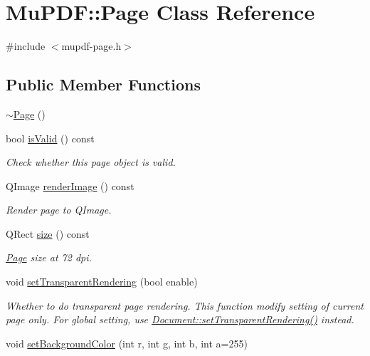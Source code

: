 \hypertarget{class_mu_p_d_f_1_1_page}{\section{Mu\-P\-D\-F\-:\-:Page Class Reference}
\label{class_mu_p_d_f_1_1_page}
}


{\ttfamily \#include $<$mupdf-\/page.\-h$>$}

\subsection*{Public Member Functions}
\begin{DoxyCompactItemize}
\item 
\hyperlink{class_mu_p_d_f_1_1_page_af319e925b5460b6b09a40aacd1d68347}{$\sim$\-Page} ()
\item 
bool \hyperlink{class_mu_p_d_f_1_1_page_a1f60d3a284731ac220a8717eb6a93167}{is\-Valid} () const 
\begin{DoxyCompactList}\small\item\em Check whether this page object is valid. \end{DoxyCompactList}\item 
Q\-Image \hyperlink{class_mu_p_d_f_1_1_page_a50c32d7917fe979dcf5404d378852556}{render\-Image} () const 
\begin{DoxyCompactList}\small\item\em Render page to Q\-Image. \end{DoxyCompactList}\item 
Q\-Rect \hyperlink{class_mu_p_d_f_1_1_page_afd724fcf89232f953315c76ec5a134b0}{size} () const 
\begin{DoxyCompactList}\small\item\em \hyperlink{class_mu_p_d_f_1_1_page}{Page} size at 72 dpi. \end{DoxyCompactList}\item 
void \hyperlink{class_mu_p_d_f_1_1_page_ac6768d64b88de1ccdd1fa0abb2724db0}{set\-Transparent\-Rendering} (bool enable)
\begin{DoxyCompactList}\small\item\em Whether to do transparent page rendering. This function modify setting of current page only. For global setting, use \hyperlink{class_mu_p_d_f_1_1_document_a8df89d0517437182406e2ba766402a3c}{Document\-::set\-Transparent\-Rendering()} instead. \end{DoxyCompactList}\item 
void \hyperlink{class_mu_p_d_f_1_1_page_a4f16778c9c61692834644d298b6ee77f}{set\-Background\-Color} (int r, int g, int b, int a=255)

\end{DoxyCompactItemize}
